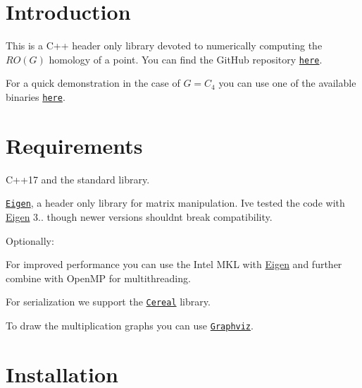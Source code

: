 \hypertarget{index_intro}{}\section{Introduction}\label{index_intro}
This is a C++ header only library devoted to numerically computing the $RO(G)$ homology of a point. You can find the Git\+Hub repository \href{https://github.com/NickG-Math/Mackey}{\tt here}.

For a quick demonstration in the case of $G=C_4$ you can use one of the available binaries \href{https://github.com/NickG-Math/Mackey/tree/master/bin}{\tt here}.\hypertarget{index_req}{}\section{Requirements}\label{index_req}

\begin{DoxyItemize}
\item C++17 and the standard library.
\item \href{ http://eigen.tuxfamily.org/index.php?title=Main_Page}{\tt Eigen}, a header only library for matrix manipulation. I\textquotesingle{}ve tested the code with \hyperlink{namespaceEigen}{Eigen} 3.. though newer versions shouldn\textquotesingle{}t break compatibility.
\end{DoxyItemize}

Optionally\+:
\begin{DoxyItemize}
\item For improved performance you can use the Intel M\+KL with \hyperlink{namespaceEigen}{Eigen} and further combine with Open\+MP for multithreading.
\item For serialization we support the \href{https://uscilab.github.io/cereal}{\tt Cereal} library.
\item To draw the multiplication graphs you can use \href{https://www.graphviz.org}{\tt Graphviz}.
\end{DoxyItemize}\hypertarget{index_install}{}\section{Installation}\label{index_install}

